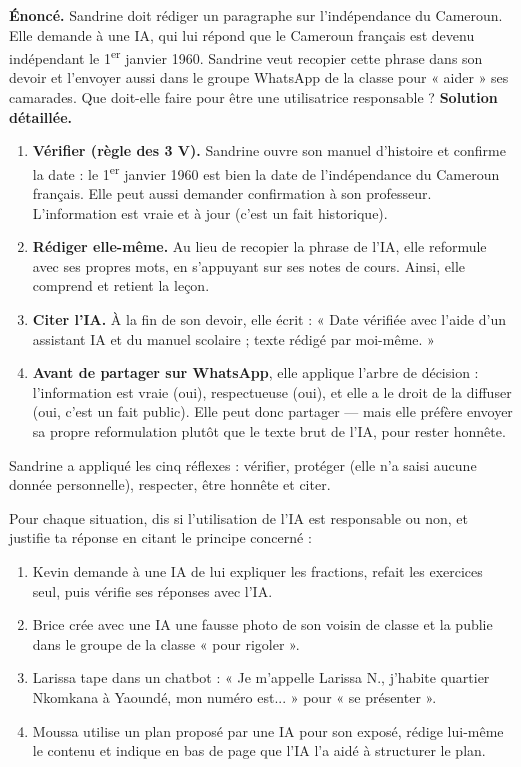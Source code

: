 \documentclass[11pt]{article}
\begin{document}
\begin{exoresolu}
\textbf{Énoncé.} Sandrine doit rédiger un paragraphe sur l'indépendance du Cameroun. Elle demande à une IA, qui lui répond que le Cameroun français est devenu indépendant le 1\textsuperscript{er} janvier 1960. Sandrine veut recopier cette phrase dans son devoir et l'envoyer aussi dans le groupe WhatsApp de la classe pour « aider » ses camarades. Que doit-elle faire pour être une utilisatrice responsable ?
\tcblower
\textbf{Solution détaillée.}
\begin{enumerate}
  \item \textbf{Vérifier (règle des 3 V).} Sandrine ouvre son manuel d'histoire et confirme la date : le 1\textsuperscript{er} janvier 1960 est bien la date de l'indépendance du Cameroun français. Elle peut aussi demander confirmation à son professeur. L'information est vraie et à jour (c'est un fait historique).
  \item \textbf{Rédiger elle-même.} Au lieu de recopier la phrase de l'IA, elle reformule avec ses propres mots, en s'appuyant sur ses notes de cours. Ainsi, elle comprend et retient la leçon.
  \item \textbf{Citer l'IA.} À la fin de son devoir, elle écrit : « Date vérifiée avec l'aide d'un assistant IA et du manuel scolaire ; texte rédigé par moi-même. »
  \item \textbf{Avant de partager sur WhatsApp}, elle applique l'arbre de décision : l'information est vraie (oui), respectueuse (oui), et elle a le droit de la diffuser (oui, c'est un fait public). Elle peut donc partager — mais elle préfère envoyer sa propre reformulation plutôt que le texte brut de l'IA, pour rester honnête.
\end{enumerate}
Sandrine a appliqué les cinq réflexes : vérifier, protéger (elle n'a saisi aucune donnée personnelle), respecter, être honnête et citer.
\end{exoresolu}

\begin{exercice}
Pour chaque situation, dis si l'utilisation de l'IA est responsable ou non, et justifie ta réponse en citant le principe concerné :
\begin{enumerate}
  \item Kevin demande à une IA de lui expliquer les fractions, refait les exercices seul, puis vérifie ses réponses avec l'IA.
  \item Brice crée avec une IA une fausse photo de son voisin de classe et la publie dans le groupe de la classe « pour rigoler ».
  \item Larissa tape dans un chatbot : « Je m'appelle Larissa N., j'habite quartier Nkomkana à Yaoundé, mon numéro est... » pour « se présenter ».
  \item Moussa utilise un plan proposé par une IA pour son exposé, rédige lui-même le contenu et indique en bas de page que l'IA l'a aidé à structurer le plan.
\end{enumerate}
\end{exercice}
\end{document}
